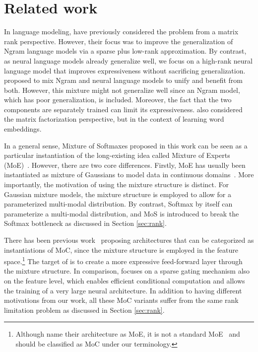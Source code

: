 \section{Related work}
In language modeling, \citet{hutchinson2011low,hutchinson2012sparse} have previously considered the problem from a matrix rank perspective. However, their focus was to improve the generalization of Ngram language models via a sparse plus low-rank approximation.
By contrast, as neural language models already generalize well, we focus on a high-rank neural language model that improves expressiveness without sacrificing generalization. 
\citet{neubig2016generalizing} proposed to mix Ngram and neural language models to unify and benefit from both.
However, this mixture might not generalize well since an Ngram model, which has poor generalization, is included. Moreover, the fact that the two components are separately trained can limit its expressiveness. \citet{levy2014neural} also considered the matrix factorization perspective, but in the context of learning word embeddings.

In a general sense, Mixture of Softmaxes proposed in this work can be seen as a particular instantiation of the long-existing idea called Mixture of Experts (MoE)~\citep{jacobs1991adaptive}.
However, there are two core differences. Firstly, MoE has usually been instantiated as mixture of Gaussians to model data in continuous domains~\citep{jacobs1991adaptive,graves2013generating,bazzani2016recurrent}. More importantly, the motivation of using the mixture structure is distinct. For Gaussian mixture models, the mixture structure is employed to allow for a parameterized multi-modal distribution. By contrast, Softmax by itself can parameterize a multi-modal distribution, and MoS is introduced to break the Softmax bottleneck as discussed in Section \ref{sec:rank}. 

There has been previous work~\citep{eigen2013learning,shazeer2017outrageously} proposing architectures that can be categorized as instantiations of MoC, since the mixture structure is employed in the feature space.\footnote{Although \citet{shazeer2017outrageously} name their architecture as MoE, it is not a standard MoE~\citep{jacobs1991adaptive} and should be classified as MoC under our terminology.}
The target of \citet{eigen2013learning} is to create a more expressive feed-forward layer through the mixture structure. In comparison, \citet{shazeer2017outrageously} focuses on a sparse gating mechanism also on the feature level, which enables efficient conditional computation and allows the training of a very large neural architecture. 
In addition to having different motivations from our work, all these MoC variants suffer from the same rank limitation problem as discussed in Section \ref{sec:rank}. 

